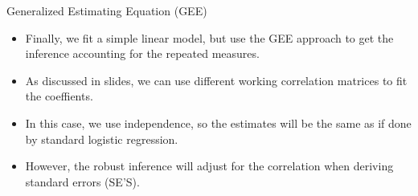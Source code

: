 \documentclass[ignorenonframetext,]{beamer}
\providecommand{\tightlist}{%
  \setlength{\itemsep}{0pt}\setlength{\parskip}{0pt}}
\begin{document}
\begin{frame}{Generalized Estimating Equation (GEE)}

\begin{itemize}
\tightlist
\item
  Finally, we fit a simple linear model, but use the GEE approach to get
  the inference accounting for the repeated measures.
\item
  As discussed in slides, we can use different working correlation
  matrices to fit the coeffients.
\item
  In this case, we use independence, so the estimates will be the same
  as if done by standard logistic regression.
\item
  However, the robust inference will adjust for the correlation when
  deriving standard errors (SE'S).
\end{itemize}

\end{frame}
\end{document}
